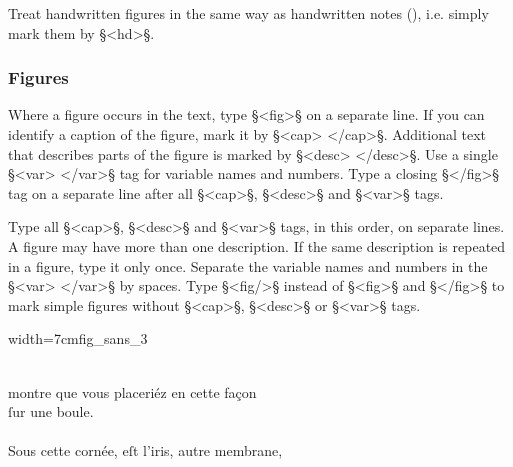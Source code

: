 \begin{note}
Treat handwritten figures in the same way as handwritten notes (), i.e. simply mark them by §<hd>§.
\end{note}


\subsubsection{Figures}
\label{section figures}

\begin{mainrule}
Where a figure occurs in the text, type §<fig>§ on a separate line. If you can identify a caption of the figure, mark it by §<cap> </cap>§. Additional text that describes parts of the figure is marked by §<desc> </desc>§. Use a single §<var> </var>§ tag for variable names and numbers. Type a closing §</fig>§ tag on a separate line after all §<cap>§, §<desc>§ and §<var>§ tags.
\end{mainrule}

\begin{clarification}
Type all §<cap>§, §<desc>§ and §<var>§ tags, in this order, on separate lines.
A figure may have more than one description.
If the same description is repeated in a figure, type it only once.
Separate the variable names and numbers in the §<var> </var>§ by spaces.
Type §<fig/>§ instead of §<fig>§ and §</fig>§ to mark simple figures without §<cap>§, §<desc>§ or §<var>§ tags.
\end{clarification}



\vspace{2mm}
\begin{sampleImageSmall}{width=7cm}{fig_sans_3}
\begin{typeLatin}
 \someText \\
montre que vous placeriéz en cette façon \\
ſur une boule. \\
 \\
Sous cette \bold{_}cornée\bold{_}, eſt \bold{_}l'iris\bold{_}, autre membrane, \\
\someText {} \\
\end{typeLatin}
\end{sampleImageSmall}

